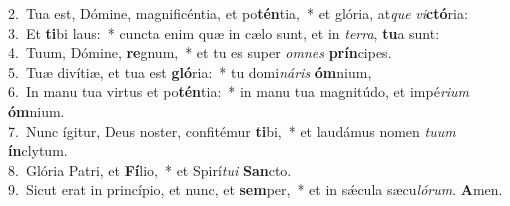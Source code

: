 {2.~}Tua est, Dómine, magnificéntia, et po\textbf{tén}tia,~* et glória, at\textit{que} \textit{vi}\textbf{ctó}ria:\\
{3.~}Et \textbf{ti}bi laus:~* cuncta enim quæ in cælo sunt, et in \textit{ter}\textit{ra}, \textbf{tu}a sunt:\\
{4.~}Tuum, Dómine, \textbf{re}gnum,~* et tu es super \textit{om}\textit{nes} \textbf{prín}cipes.\\
{5.~}Tuæ divítiæ, et tua est \textbf{gló}ria:~* tu domi\textit{ná}\textit{ris} \textbf{óm}nium,\\
{6.~}In manu tua virtus et po\textbf{tén}tia:~* in manu tua magnitúdo, et impé\textit{ri}\textit{um} \textbf{óm}nium.\\
{7.~}Nunc ígitur, Deus noster, confitémur \textbf{ti}bi,~* et laudámus nomen \textit{tu}\textit{um} \textbf{ín}clytum.\\
{8.~}Glória Patri, et \textbf{Fí}lio,~* et Spirí\textit{tu}\textit{i} \textbf{San}cto.\\
{9.~}Sicut erat in princípio, et nunc, et \textbf{sem}per,~* et in sǽcula sæcu\textit{ló}\textit{rum}. \textbf{A}men.\\
